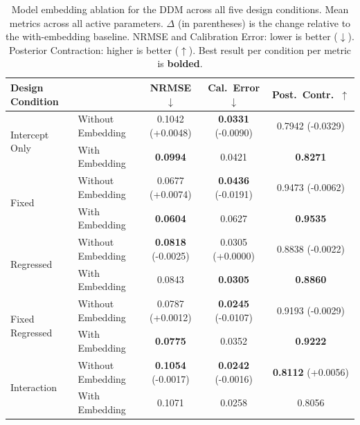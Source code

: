\documentclass{article}
\begin{document}
\begin{table}[t]
\centering
\small
\caption{Model embedding ablation for the DDM across all five design conditions.
Mean metrics across all active parameters.
$\Delta$ (in parentheses) is the change relative to the with-embedding baseline.
NRMSE and Calibration Error: lower is better ($\downarrow$).
Posterior Contraction: higher is better ($\uparrow$).
Best result per condition per metric is \textbf{bolded}.}
\label{tab:ddm_embedding_ablation}
\begin{tabular}{l l ccc}
\toprule
Design Condition & & NRMSE $\downarrow$ & Cal.\ Error $\downarrow$ & Post.\ Contr.\ $\uparrow$ \\
\midrule
\multirow{2}{*}{Intercept Only}
 & Without Embedding & 0.1042 \small{(+0.0048)} & \textbf{0.0331} \small{(-0.0090)} & 0.7942 \small{(-0.0329)} \\
 & With Embedding    & \textbf{0.0994}           & 0.0421                            & \textbf{0.8271}           \\
\midrule
\multirow{2}{*}{Fixed}
 & Without Embedding & 0.0677 \small{(+0.0074)} & \textbf{0.0436} \small{(-0.0191)} & 0.9473 \small{(-0.0062)} \\
 & With Embedding    & \textbf{0.0604}           & 0.0627                            & \textbf{0.9535}           \\
\midrule
\multirow{2}{*}{Regressed}
 & Without Embedding & \textbf{0.0818} \small{(-0.0025)} & 0.0305 \small{(+0.0000)} & 0.8838 \small{(-0.0022)} \\
 & With Embedding    & 0.0843                            & \textbf{0.0305}          & \textbf{0.8860}           \\
\midrule
\multirow{2}{*}{Fixed Regressed}
 & Without Embedding & 0.0787 \small{(+0.0012)} & \textbf{0.0245} \small{(-0.0107)} & 0.9193 \small{(-0.0029)} \\
 & With Embedding    & \textbf{0.0775}           & 0.0352                            & \textbf{0.9222}           \\
\midrule
\multirow{2}{*}{Interaction}
 & Without Embedding & \textbf{0.1054} \small{(-0.0017)} & \textbf{0.0242} \small{(-0.0016)} & \textbf{0.8112} \small{(+0.0056)} \\
 & With Embedding    & 0.1071                            & 0.0258                            & 0.8056                            \\
\bottomrule
\end{tabular}
\end{table}
\end{document}
